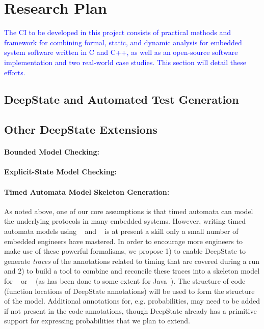 \section{Research Plan}

%

\textcolor{blue}{The CI to be developed in this project consists of practical methods and framework for combining formal, static, and dynamic analysis for embedded system software written in C and C++, as well as an open-source software implementation and two real-world case studies.  This section will detail these efforts.}

\subsection{DeepState and Automated Test Generation}
\label{sec:framac2deepstate}


\subsection{Other DeepState Extensions}

\paragraph{Bounded Model Checking:}


\paragraph{Explicit-State Model Checking:}


\paragraph{Timed Automata Model Skeleton Generation:}
As noted above, one of our core assumptions is that timed automata can
model the underlying protocols in many embedded systems.  However,
writing timed automata models using \uppaal~\cite{uppaal} and
\prism~\cite{KNP2011:CAV} is at present a skill only a small number of
embedded engineers have mastered.  In order to encourage more
engineers to make use of these powerful formalisms, we propose 1) to
enable DeepState to generate \emph{traces} of the annotations related
to timing that are covered during a run and 2) to build a tool to
combine and reconcile these traces into a skeleton model for \uppaal~\cite{uppaal} or
\prism~\cite{KNP2011:CAV} (as has been done to some extent for Java~\cite{liva2017extracting}).  The structure of code (function locations
of DeepState annotations) will be used to form the structure of the
model.  Additional annotations for, e.g. probabilities, may need to be
added if not present in the code annotations, though DeepState already
has a primitive support for expressing probabilities that we plan to extend.

